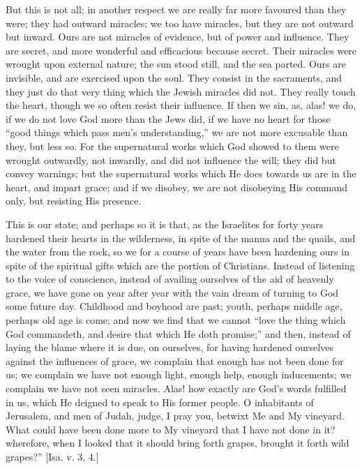 But this is not all; in another respect we are really far more
favoured than they were; they had outward miracles; we too have
miracles, but they are not outward but inward. Ours are not miracles
of evidence, but of power and influence. They are secret, and more
wonderful and efficacious because secret. Their miracles were wrought
upon external nature; the sun stood still, and the sea parted. Ours
are invisible, and are exercised upon the soul. They consist in the
sacraments, and they just do that very thing which the Jewish miracles
did not. They really touch the heart, though we so often resist their
influence. If then we sin, as, alas! we do, if we do not love God more
than the Jews did, if we have no heart for those ``good things
which pass men's understanding,'' we are not more excusable than
they, but less so. For the supernatural works which God showed to them
were wrought outwardly, not inwardly, and did not influence the will;
they did but convey warnings; but the supernatural works which He does
towards us are in the heart, and impart grace; and if we disobey, we
are not disobeying His command only, but resisting His presence.

This is our state; and perhaps so it is that, as the Israelites for
forty years hardened their hearts in the wilderness, in spite of the
manna and the quails, and the water from the rock, so we for a course
of years have been hardening ours in spite of the spiritual gifts
which are the portion of Christians. Instead of listening to the voice
of conscience, instead of availing ourselves of the aid of heavenly
grace, we have gone on year after year with the vain dream of turning
to God some future day. Childhood and boyhood are past; youth, perhaps
middle age, perhaps old age is come; and now we find that we cannot
``love the thing which God commandeth, and desire that which He
doth promise;'' and then, instead of laying the blame where it is
due, on ourselves, for having hardened ourselves against the
influences of grace, we complain that enough has not been done for us;
we complain we have not enough light, enough help, enough inducements;
we complain we have not seen miracles. Alas! how exactly are God's
words fulfilled in us, which He deigned to speak to His former people.
O inhabitants of Jerusalem, and men of Judah, judge, I pray you,
betwixt Me and My vineyard. What could have been done more to My
vineyard that I have not done in it? wherefore, when I looked that it
should bring forth grapes, brought it forth wild grapes?'' [Isa.
v. 3, 4.]

